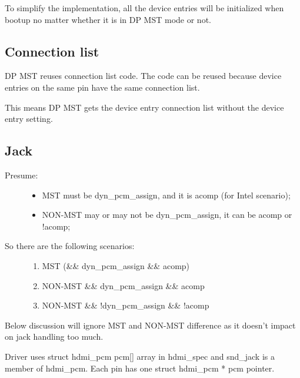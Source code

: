 \documentclass[a4paper,8pt,english]{sphinxmanual}
\begin{document}
To simplify the implementation, all the device entries will be initialized
when bootup no matter whether it is in DP MST mode or not.


\subsection{Connection list}
\label{sound/hd-audio/dp-mst:connection-list}
DP MST reuses connection list code. The code can be reused because
device entries on the same pin have the same connection list.

This means DP MST gets the device entry connection list without the
device entry setting.


\subsection{Jack}
\label{sound/hd-audio/dp-mst:jack}\begin{description}
\item[{Presume:}] \leavevmode\begin{itemize}
\item {} 
MST must be dyn\_pcm\_assign, and it is acomp (for Intel scenario);

\item {} 
NON-MST may or may not be dyn\_pcm\_assign, it can be acomp or !acomp;

\end{itemize}

\item[{So there are the following scenarios:}] \leavevmode\begin{enumerate}
\item {} 
MST (\&\& dyn\_pcm\_assign \&\& acomp)

\item {} 
NON-MST \&\& dyn\_pcm\_assign \&\& acomp

\item {} 
NON-MST \&\& !dyn\_pcm\_assign \&\& !acomp

\end{enumerate}

\end{description}

Below discussion will ignore MST and NON-MST difference as it doesn't
impact on jack handling too much.

Driver uses struct hdmi\_pcm pcm{[}{]} array in hdmi\_spec and snd\_jack is
a member of hdmi\_pcm. Each pin has one struct hdmi\_pcm * pcm pointer.
\end{document}
